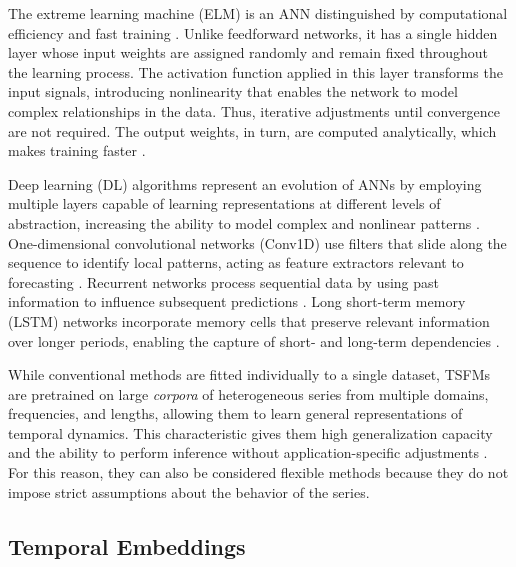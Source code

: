 \documentclass[final,3p,times,twocolumn,authoryear]{elsarticle}
\begin{document}
The extreme learning machine (ELM) is an ANN distinguished by computational efficiency and fast training \citep{huang_extreme_2006}. Unlike feedforward networks, it has a single hidden layer whose input weights are assigned randomly and remain fixed throughout the learning process. The activation function applied in this layer transforms the input signals, introducing nonlinearity that enables the network to model complex relationships in the data. Thus, iterative adjustments until convergence are not required. The output weights, in turn, are computed analytically, which makes training faster \citep{huang_extreme_2006}.

Deep learning (DL) algorithms represent an evolution of ANNs by employing multiple layers capable of learning representations at different levels of abstraction, increasing the ability to model complex and nonlinear patterns \citep{schmidhuber_deep_2015}. One-dimensional convolutional networks (Conv1D) use filters that slide along the sequence to identify local patterns, acting as feature extractors relevant to forecasting \citep{larabenitez_temporal_2020}. Recurrent networks process sequential data by using past information to influence subsequent predictions \citep{schmidhuber_deep_2015}. Long short-term memory (LSTM) networks incorporate memory cells that preserve relevant information over longer periods, enabling the capture of short- and long-term dependencies \citep{hochreiter_long_1997}.

While conventional methods are fitted individually to a single dataset, TSFMs are pretrained on large \textit{corpora} of heterogeneous series from multiple domains, frequencies, and lengths, allowing them to learn general representations of temporal dynamics. This characteristic gives them high generalization capacity and the ability to perform inference without application-specific adjustments \citep{gruver_large_2023}. For this reason, they can also be considered flexible methods because they do not impose strict assumptions about the behavior of the series.

\subsection{Temporal Embeddings}
\label{sec_embeds}
\end{document}
